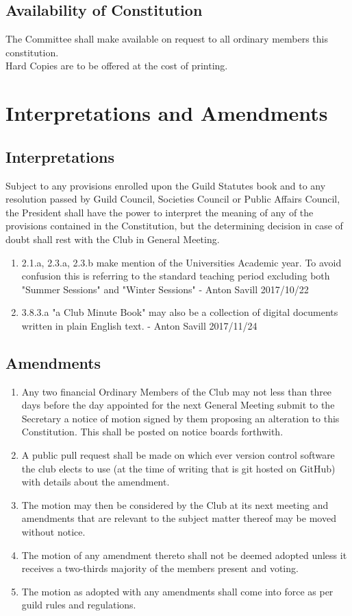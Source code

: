 \documentclass[10pt,a4paper]{report}
\begin{document}
		\section{Availability of Constitution}
			The Committee shall make available on request to all ordinary members this constitution. \\
			Hard Copies are to be offered at the cost of printing.

	\chapter{Interpretations and Amendments}

	\section{Interpretations}
		Subject to any provisions enrolled upon the Guild Statutes book and to any resolution passed by Guild Council, Societies Council or Public Affairs Council, the President shall have the power to interpret the meaning of any of the provisions contained in the Constitution, but the determining decision in case of doubt shall rest with the Club in General Meeting.
		\begin{enumerate}[label=\arabic*]
			\item 2.1.a, 2.3.a, 2.3.b make mention of the Universities Academic year. To avoid confusion this is referring to the standard teaching period excluding both "Summer Sessions" and "Winter Sessions" - Anton Savill 2017/10/22
			\item 3.8.3.a "a Club Minute Book" may also be a collection of digital documents written in plain English text. - Anton Savill  2017/11/24
		\end{enumerate}

	\section{Amendments}
		\begin{enumerate}[label=\alph*]
			\item Any two financial Ordinary Members of the Club may not less than three days before the day appointed for the next General Meeting submit to the Secretary a notice of motion signed by them proposing an alteration to this Constitution. This shall be posted on notice boards forthwith.
			\item A public pull request shall be made on which ever version control software the club elects to use (at the time of writing that is git hosted on GitHub) with details about the amendment.
			\item The motion may then be considered by the Club at its next meeting and amendments that are relevant to the subject matter thereof may be moved without notice.
			\item The motion of any amendment thereto shall not be deemed adopted unless it receives a two-thirds majority of the members present and voting.
			\item The motion as adopted with any amendments shall come into force as per guild rules and regulations.
		\end{enumerate}
\end{document}
